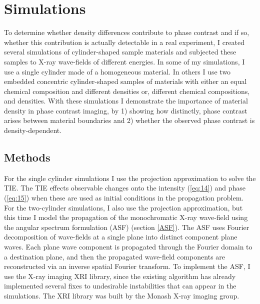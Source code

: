 \documentclass[10pt, a4paper, singlespacing]{report}
\begin{document}
\chapter{Simulations}\label{Simulations}

To determine whether density differences contribute to phase contrast and if so, whether this contribution is actually detectable in a real experiment, I created several simulations of cylinder-shaped sample materials and subjected these samples to X-ray wave-fields of different energies. In some of my simulations, I use a single cylinder made of a homogeneous material. In others I use two embedded concentric cylinder-shaped samples of materials with either an equal chemical composition and different densities or, different chemical compositions, and densities. With these simulations I demonstrate the importance of material density in phase contrast imaging,  by 1) showing how distinctly, phase contrast arises between material boundaries and 2) whether the observed phase contrast is density-dependent. 


\section{Methods}\label{Methods}

For the single cylinder simulations I use the projection approximation to solve the TIE. The TIE effects observable changes onto the intensity (\ref{eq:14}) and phase (\ref{eq:15}) when these are used as initial conditions in the propagation problem. For the two-cylinder simulations, I also use the projection approximation, but this time I model the propagation of the monochromatic X-ray wave-field using the angular spectrum formulation (ASF) (section \ref{ASF}). The ASF uses Fourier decomposition of wave-fields at a single plane into distinct component plane waves. Each plane wave component is propagated through the Fourier domain to a destination plane, and then the propagated wave-field components are reconstructed via an inverse spatial Fourier transform\cite{Goodman}. To implement the ASF, I use the X-ray imaging XRI library, since the existing algorithm has already implemented several fixes to undesirable instabilities that can appear in the simulations. The XRI library was built by the Monash X-ray imaging group.
\end{document}
